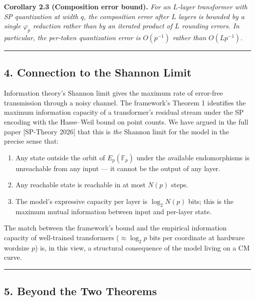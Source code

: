 \documentclass[
  11pt,
]{article}
\providecommand{\tightlist}{%
  \setlength{\itemsep}{0pt}\setlength{\parskip}{0pt}}
\begin{document}
\textbf{Corollary 2.3 (Composition error bound).} \emph{For an
\(L\)-layer transformer with SP quantization at width \(q\), the
composition error after \(L\) layers is bounded by a single
\(\varphi_p\) reduction rather than by an iterated product of \(L\)
rounding errors. In particular, the per-token quantization error is
\(O(p^{-1})\) rather than \(O(L p^{-1})\).}

\begin{center}\rule{0.5\linewidth}{0.5pt}\end{center}

\hypertarget{connection-to-the-shannon-limit}{%
\subsection{4. Connection to the Shannon
Limit}\label{connection-to-the-shannon-limit}}

Information theory's Shannon limit gives the maximum rate of error-free
transmission through a noisy channel. The framework's Theorem 1
identifies the maximum information capacity of a transformer's residual
stream under the SP encoding with the Hasse--Weil bound on point counts.
We have argued in the full paper {[}SP-Theory 2026{]} that this is
\emph{the} Shannon limit for the model in the precise sense that:

\begin{enumerate}
\def\labelenumi{\arabic{enumi}.}
\tightlist
\item
  Any state outside the orbit of \(E_p(\mathbb{F}_p)\) under the
  available endomorphisms is unreachable from any input --- it cannot be
  the output of any layer.
\item
  Any reachable state is reachable in at most \(N(p)\) steps.
\item
  The model's expressive capacity per layer is \(\log_2 N(p)\) bits;
  this is the maximum mutual information between input and per-layer
  state.
\end{enumerate}

The match between the framework's bound and the empirical information
capacity of well-trained transformers (\(\approx \log_2 p\) bits per
coordinate at hardware wordsize \(p\)) is, in this view, a structural
consequence of the model living on a CM curve.

\begin{center}\rule{0.5\linewidth}{0.5pt}\end{center}

\hypertarget{beyond-the-two-theorems}{%
\subsection{5. Beyond the Two Theorems}\label{beyond-the-two-theorems}}
\end{document}
